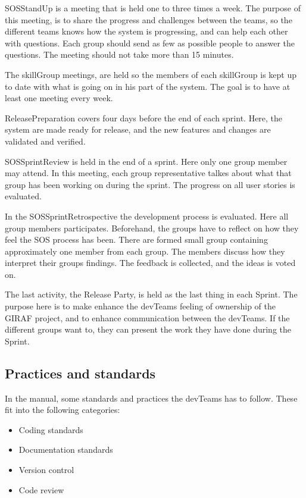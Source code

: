 \Gls{SOSStandUp} is a meeting that is held one to three times a week. The purpose of this meeting, is to share the progress and challenges between the teams, so the different teams knows how the system is progressing, and can help each other with questions. 
Each group should send as few as possible people to answer the questions. The meeting should not take more than 15 minutes. 

The \Gls{skillGroup} meetings, are held so the members of each \gls{skillGroup} is kept up to date with what is going on in his part of the system. The goal is to have at least one meeting every week. 

\Gls{ReleasePreparation} covers four days before the end of each sprint. Here, the system are made ready for release, and the new features and changes are validated and verified. 

\Gls{SOSSprintReview} is held in the end of a sprint. Here only one group member may attend. In this meeting, each group representative talkes about what that group has been working on during the sprint. The progress on all user stories is evaluated. 

In the \gls{SOSSprintRetrospective} the development process is evaluated. Here all group members participates. Beforehand, the groups have to reflect on how they feel the \gls{SOS} process has been. There are formed small group containing approximately one member from each group. The members discuss how they interpret their groups findings. The feedback is collected, and the ideas is voted on. 

The last activity, the Release Party, is held as the last thing in each Sprint. The purpose here is to make enhance the \glspl{devTeam} feeling of ownership of the GIRAF project, and to enhance communication between the \glspl{devTeam}. If the different groups want to, they can present the work they have done during the Sprint.

\subsection*{Practices and standards} 
In the manual, some standards and practices the \glspl{devTeam} has to follow. These fit into the following categories:
\begin{itemize}
    \item Coding standards
    \item Documentation standards
    \item Version control
    \item Code review
\end{itemize}


